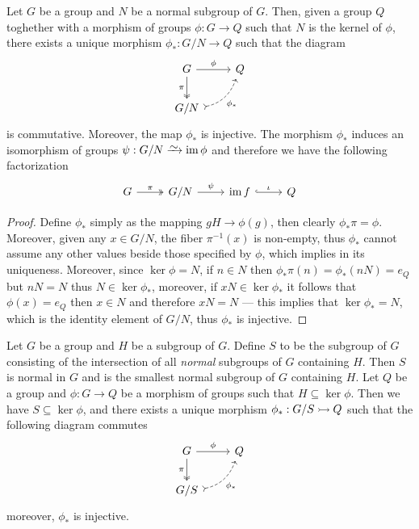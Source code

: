 \begin{proposition}
\label{prop:universal-property-quotients-grp}
Let \(G\) be a group and \(N\) be a normal subgroup of \(G\). Then, given a
group \(Q\) toghether with a morphism of groups \(\phi: G \to Q\) such that
\(N\) is the kernel of \(\phi\), there exists a unique morphism
\(\phi_{*}: G/N \to Q\) such that the diagram
\[
  \begin{tikzcd}
    G \ar[d, two heads, swap, "\pi"] \ar[r, "\phi"] &Q \\
    G/N \ar[ur, dashed, swap, bend right, tail, "\phi_{*}"] &
  \end{tikzcd}
\]
is commutative. Moreover, the map \(\phi_*\) is injective. The morphism
\(\phi_{*}\) induces an isomorphism of groups \(\psi: G/N \isoto \im \phi\) and
therefore we have the following factorization
\[
  \begin{tikzcd}
    G \ar[r, two heads, "\pi"] &G/N \ar[r, "\psi"]
    &\im f \ar[r, hook, "\iota"] &Q
  \end{tikzcd}
\]
\end{proposition}

\begin{proof}
Define \(\phi_{*}\) simply as the mapping \(gH \to \phi(g)\), then clearly
\(\phi_{*} \pi = \phi\). Moreover, given any \(x \in G/N\), the fiber
\(\pi^{-1}(x)\) is non-empty, thus \(\phi_{*}\) cannot assume any other values
beside those specified by \(\phi\), which implies in its uniqueness. Moreover,
since \(\ker \phi = N\), if \(n \in N\) then
\(\phi_{*} \pi(n) = \phi_{*}(n N) = e_{Q}\) but \(n N = N\) thus
\(N \in \ker \phi_{*}\), moreover, if \(x N \in \ker \phi_{*}\) it follows that
\(\phi(x) = e_Q\) then \(x \in N\) and therefore \(x N = N\) --- this implies
that \(\ker \phi_{*} = N\), which is the identity element of \(G/N\), thus
\(\phi_{*}\) is injective.
\end{proof}

\begin{corollary}
\label{cor:universal-property-quotients-grp}
Let \(G\) be a group and \(H\) be a subgroup of \(G\). Define \(S\) to be the
subgroup of \(G\) consisting of the intersection of all \emph{normal} subgroups
of \(G\) containing \(H\). Then \(S\) is normal in \(G\) and is the smallest
normal subgroup of \(G\) containing \(H\). Let \(Q\) be a group and \(\phi: G
\to Q\) be a morphism of groups such that \(H \subseteq \ker \phi\). Then we
have \(S \subseteq \ker \phi\), and there exists a unique morphism \(\phi_{*}:
G/S \rightarrowtail Q\) such that the following diagram commutes
\[
  \begin{tikzcd}
    G \ar[d, two heads, swap, "\pi"] \ar[r, "\phi"] &Q \\
    G/S \ar[ur, dashed, swap, bend right, tail, "\phi_{*}"] &
  \end{tikzcd}
\]
moreover, \(\phi_{*}\) is injective.
\end{corollary}

